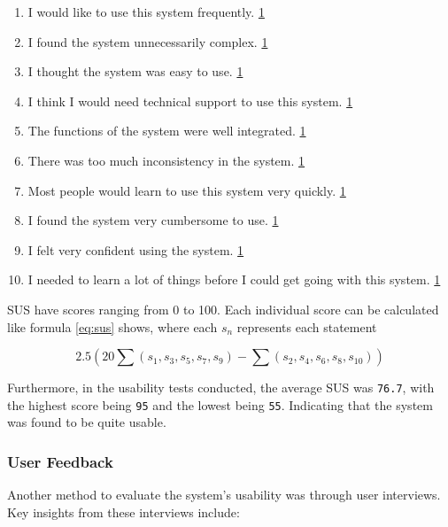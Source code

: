 \begin{enumerate}[label=\textbf{\arabic*.}]
    \item I would like to use this system frequently. \hfill \underline{1    }
    \item I found the system unnecessarily complex. \hfill \underline{1    }
    \item I thought the system was easy to use. \hfill \underline{1    }
    \item I think I would need technical support to use this system. \hfill \underline{1    }
    \item The functions of the system were well integrated. \hfill \underline{1    }
    \item There was too much inconsistency in the system. \hfill \underline{1    }
    \item Most people would learn to use this system very quickly. \hfill \underline{1    }
    \item I found the system very cumbersome to use. \hfill \underline{1    }
    \item I felt very confident using the system. \hfill \underline{1    }
    \item I needed to learn a lot of things before I could get going with this system. \hfill \underline{1    }
\end{enumerate}

SUS have scores ranging from 0 to 100. Each individual score can be calculated like formula \ref{eq:sus} shows, where each $s_n$ represents each statement

\begin{equation}
    2.5 \left(20 \sum(s_1,s_3,s_5,s_7,s_9) - \sum(s_2,s_4,s_6,s_8,s_{10})\right) \label{eq:sus}
\end{equation}

Furthermore, in the usability tests conducted, the average SUS was \verb|76.7|, with the highest score being \verb|95| and the lowest being \verb|55|. Indicating that the system was found to be quite usable.


\subsubsection{User Feedback}
Another method to evaluate the system's usability was through user interviews. Key insights from these interviews include:

